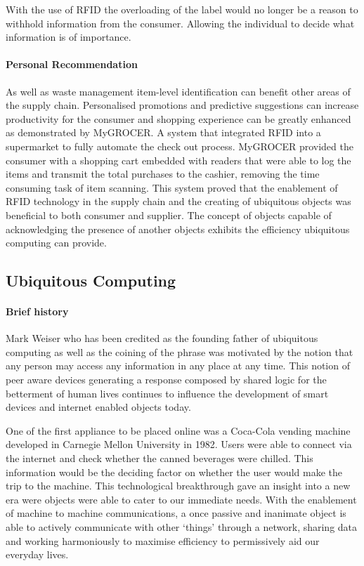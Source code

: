\documentclass[a4paper, 11pt]{article}
\begin{document}
With the use of RFID the overloading of the label would no longer be a reason to withhold information from the consumer. Allowing the individual to decide what information is of importance.


\paragraph{Personal Recommendation} As well as waste management item-level identification can benefit other areas of the supply chain. Personalised promotions and predictive suggestions can increase productivity for the consumer and shopping experience can be greatly enhanced as demonstrated by MyGROCER\cite{myGrocer}. A system that integrated RFID into a supermarket to fully automate the check out process. MyGROCER provided the consumer with a shopping cart embedded with readers that were able to log the items and transmit the total purchases to the cashier, removing the time consuming task of item scanning. This system proved that the enablement of RFID technology in the supply chain and the creating of ubiquitous objects was beneficial to both consumer and supplier.\cite{pervasiveComp} The concept of objects capable of acknowledging the presence of another objects exhibits the efficiency ubiquitous computing can provide.

\vspace{\baselineskip}
\vspace{\baselineskip}
\vspace{\baselineskip}

\subsection{Ubiquitous Computing}

\paragraph{Brief history} Mark Weiser who has been credited as the founding father of ubiquitous computing as well as the coining of the phrase was motivated by the notion that any person may access any information in any place at any time.\cite{weiser} This notion of peer aware devices generating a response composed by shared logic for the betterment of human lives continues to influence the development of smart devices and internet enabled objects today.  

One of the first appliance to be placed online was a Coca-Cola vending machine developed in Carnegie Mellon University in 1982. Users were able to connect via the internet and check whether the canned beverages were chilled. This information would be the deciding factor on whether the user would make the trip to the machine. This technological breakthrough gave an insight into a new era were objects were able to cater to our immediate needs. With the enablement of machine to machine communications, a once passive and inanimate object is able to actively communicate with other `things' through a network, sharing data and working harmoniously to maximise efficiency to permissively aid our everyday lives.
\end{document}
